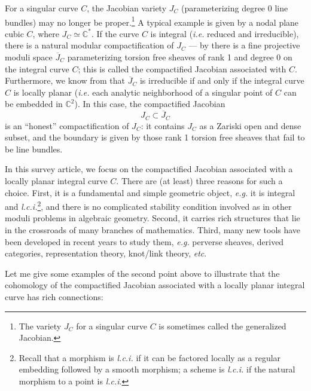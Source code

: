 \documentclass{pspum-l}
\theoremstyle{plain}
\theoremstyle{definition}
\theoremstyle{remark}
\newcommand{\BC}{{\mathbb{C}}}
\begin{document}
For a singular curve $C$, the Jacobian variety $J_C$ (parameterizing degree 0 line bundles) may no longer be proper.\footnote{The variety $J_C$ for a singular curve $C$ is sometimes called the generalized Jacobian.} A typical example is given by a nodal plane cubic $C$, where $J_C \simeq \BC^*$. If the curve $C$ is integral (\emph{i.e.} reduced and irreducible), there is a natural modular compactification of $J_C$ --- by \cite{AK} there is a fine projective moduli space $\overline{J}_C$ parameterizing torsion free sheaves of rank 1 and degree 0 on the integral curve $C$; this is called the compactified Jacobian associated with $C$. Furthermore, we know from \cite{AIK, KK} that $\overline{J}_C$ is irreducible if and only if the integral curve $C$ is locally planar (\emph{i.e.} each analytic neighborhood of a singular point of $C$ can be embedded in $\mathbb{C}^2$). In this case, the compactified Jacobian 
\[
J_C \subset \overline{J}_C
\]
is an ``honest'' compactification of $J_C$: it contains $J_C$ as a Zariski open and dense subset, and the boundary is given by those rank 1 torsion free sheaves that fail to be line bundles.

In this survey article, we focus on the compactified Jacobian associated with a locally planar integral curve $C$. There are (at least) three reasons for such a choice. First, it is a fundamental and simple geometric object, \emph{e.g.} it is integral and  \emph{l.c.i.}\footnote{Recall that a morphism is \emph{l.c.i.} if it can be factored locally as a regular embedding followed by a smooth morphism; a scheme is \emph{l.c.i.} if the natural morphism to a point is \emph{l.c.i}.}, and there is no complicated stability condition involved as in other moduli problems in algebraic geometry. Second, it carries rich structures that lie in the crossroads of many branches of mathematics. Third, many new tools have been developed in recent years to study them, \emph{e.g.} perverse sheaves, derived categories, representation theory, knot/link theory, \emph{etc}.

Let me give some examples of the second point above to illustrate that the cohomology of the compactified Jacobian associated with a locally planar integral curve has rich connections:
\end{document}
